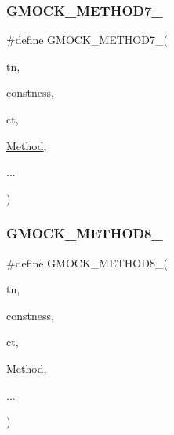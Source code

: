 \mbox{\label{_obj__test_2lib_2googletest-master_2googlemock_2include_2gmock_2gmock-generated-function-mockers_8h_ab98a8399ba62b53b375c2807f4d39d2f}} 
\subsubsection{\texorpdfstring{GMOCK\_METHOD7\_}{GMOCK\_METHOD7\_}}
{\footnotesize\ttfamily \#define G\+M\+O\+C\+K\+\_\+\+M\+E\+T\+H\+O\+D7\+\_\+(\begin{DoxyParamCaption}\item[{}]{tn,  }\item[{}]{constness,  }\item[{}]{ct,  }\item[{}]{\mbox{\hyperlink{_obj__test_2lib_2googletest-release-1_88_81_2googlemock_2test_2gmock-spec-builders__test_8cc_a95606368148f3e5aab5db46c32466afd}{Method}},  }\item[{}]{... }\end{DoxyParamCaption})}

\mbox{\label{_obj__test_2lib_2googletest-master_2googlemock_2include_2gmock_2gmock-generated-function-mockers_8h_aa84a36427c44505207b7cad5dec7ad67}} 
\subsubsection{\texorpdfstring{GMOCK\_METHOD8\_}{GMOCK\_METHOD8\_}}
{\footnotesize\ttfamily \#define G\+M\+O\+C\+K\+\_\+\+M\+E\+T\+H\+O\+D8\+\_\+(\begin{DoxyParamCaption}\item[{}]{tn,  }\item[{}]{constness,  }\item[{}]{ct,  }\item[{}]{\mbox{\hyperlink{_obj__test_2lib_2googletest-release-1_88_81_2googlemock_2test_2gmock-spec-builders__test_8cc_a95606368148f3e5aab5db46c32466afd}{Method}},  }\item[{}]{... }\end{DoxyParamCaption})}


